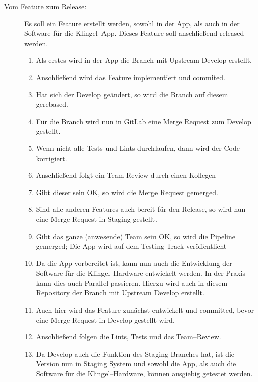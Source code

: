     \begin{description}
        \item[Vom Feature zum Release:] Es soll ein Feature  erstellt werden, sowohl in der App, als auch in der Software für die Klingel--App.
            Dieses Feature soll anschließend released werden.
            \begin{enumerate}
                \item Als erstes wird in der App die Branch  mit Upstream Develop erstellt.
                \item Anschließend wird das Feature implementiert und commited.
                \item Hat sich der Develop geändert, so wird die Branch auf diesem gerebased.
                \item Für die Branch wird nun in GitLab eine Merge Request zum Develop gestellt.
                \item Wenn nicht alle Tests und Lints durchlaufen, dann wird der Code korrigiert.
                \item Anschließend folgt ein Team Review durch einen Kollegen
                \item Gibt dieser sein OK, so wird die Merge Request gemerged.
                \item Sind alle anderen Features auch bereit für den Release, so wird nun eine Merge Request in Staging gestellt.
                \item Gibt das ganze (anwesende) Team sein OK, so wird die Pipeline gemerged;
                    Die App wird auf dem Testing Track veröffentlicht
                \item Da die App vorbereitet ist, kann nun auch die Entwicklung der Software für die Klingel--Hardware entwickelt werden.
                    In der Praxis kann dies auch Parallel passieren.
                    Hierzu wird auch in diesem Repository der Branch  mit Upstream Develop erstellt.
                \item Auch hier wird das Feature zunächst entwickelt und committed, bevor eine Merge Request in Develop gestellt wird.
                \item Anschließend folgen die Lints, Tests und das Team--Review.
                \item Da Develop auch die Funktion des Staging Branches hat, ist die Version nun in Staging System und sowohl die App, als auch die Software für die Klingel--Hardware, können ausgiebig getestet werden.

\end{enumerate}
\end{description}
